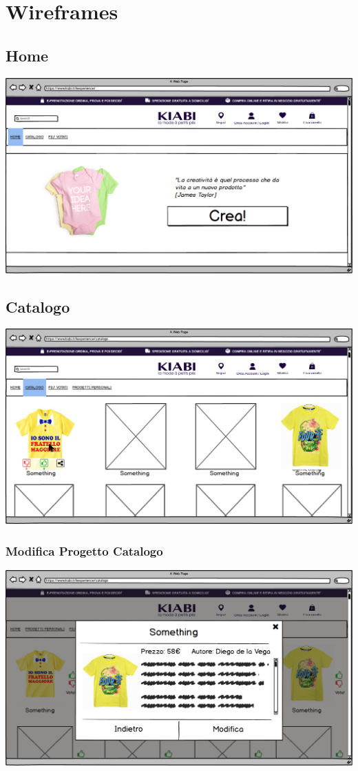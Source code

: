 \documentclass[12pt,italian,]{report}
\begin{document}
\section{Wireframes}\label{Wireframes}
\subsection{Home} 
\includegraphics{balsamiq/Home Sottosito Utente Esterno .png}
\subsection{Catalogo} 
\includegraphics{balsamiq/Catalogo.png}
\subsubsection{Modifica Progetto Catalogo} 
\includegraphics{balsamiq/Catalogo details.png}
\end{document}
